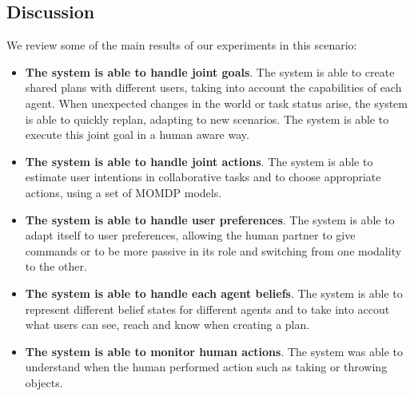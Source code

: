 \subsection{Discussion}
\label{subsec:case_study-helper-discussion}
We review some of the main results of our experiments in this scenario:
\begin{itemize}

\item
\textbf{The system is able to handle joint goals}.
The system is able to create shared plans with different users, taking
into account the capabilities of each agent. When unexpected changes
in the world or task status arise, the system is able to quickly
replan, adapting to new scenarios. The system is able to execute this
joint goal in a human aware way. 
                                
\item
\textbf{The system is able to handle joint actions}.
The system is able to estimate user intentions in collaborative tasks and to choose appropriate actions, using a set of MOMDP models.

\item
\textbf{The system is able to handle user preferences}.
The system is able to adapt itself to user preferences, allowing the
human partner to give commands or to be more passive in its role and
switching from one modality to the other. 
\item
\textbf{The system is able to handle each agent beliefs}.
The system is able to represent different belief states for different agents and to take into accout what users can see, reach and know when creating a plan.

\item
\textbf{The system is able to monitor human actions}.
The system was able to understand when the human performed action such as taking or throwing objects.
\end{itemize}
